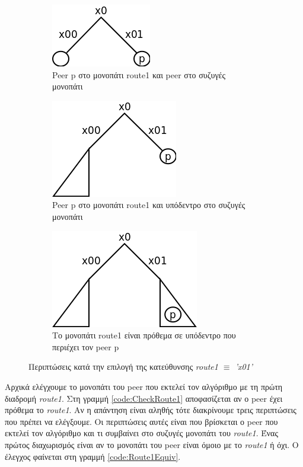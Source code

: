 \begin{figure}[ht]
    \centering
    \begin{subfigure}[b]{0.3\textwidth}
        \centering
        \includegraphics[scale=0.4]{Figures/Protocol/conPeer_route1equiv.png}
        \caption{Peer p στο μονοπάτι route1 και peer στο συζυγές μονοπάτι}
        \label{fig:Route1Case1a}
    \end{subfigure}
    \quad
    \begin{subfigure}[b]{0.3\textwidth}
        \centering
        \includegraphics[scale=0.4]{Figures/Protocol/conSubtree_route1equiv.png}
        \caption{Peer p στο μονοπάτι route1 και υπόδεντρο στο συζυγές μονοπάτι}
        \label{fig:Route1Case1b}
    \end{subfigure}
    \quad
    \begin{subfigure}[b]{0.3\textwidth}
        \centering
        \includegraphics[scale=0.4]{Figures/Protocol/conSubtree_route1subtree.png}
        \caption{Το μονοπάτι route1 είναι πρόθεμα σε υπόδεντρο που περιέχει τον peer p}
        \label{fig:Route1Case2}
    \end{subfigure}
    \caption{Περιπτώσεις κατά την επιλογή της κατεύθυνσης \textit{route1 $\equiv$ 'x01'}}
    \label{fig:Route1}
\end{figure}

Αρχικά ελέγχουμε το μονοπάτι του peer που εκτελεί τον αλγόριθμο με τη πρώτη 
διαδρομή \textit{route1}. Στη γραμμή \ref{code:CheckRoute1} αποφασίζεται αν 
ο peer έχει πρόθεμα το \textit{route1}. Αν η απάντηση είναι αληθής τότε 
διακρίνουμε τρεις περιπτώσεις που πρέπει να ελέγξουμε. Οι περιπτώσεις αυτές 
είναι που βρίσκεται ο peer που εκτελεί τον αλγόριθμο και τι συμβαίνει στο 
συζυγές μονοπάτι του \textit{route1}. Ένας πρώτος διαχωρισμός είναι αν 
το μονοπάτι του peer είναι όμοιο με το \textit{route1} ή όχι. Ο έλεγχος 
φαίνεται στη γραμμή \ref{code:Route1Equiv}. 

